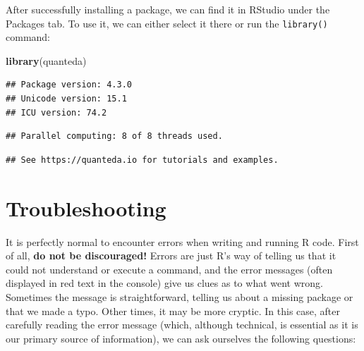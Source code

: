 \documentclass[
]{book}
\newenvironment{Shaded}{\begin{snugshade}}{\end{snugshade}}
\newcommand{\FunctionTok}[1]{\textcolor[rgb]{0.13,0.29,0.53}{\textbf{#1}}}
\newcommand{\NormalTok}[1]{#1}
\begin{document}
After successfully installing a package, we can find it in RStudio under the Packages tab. To use it, we can either select it there or run the \texttt{library()} command:

\begin{Shaded}
\begin{Highlighting}[]
\FunctionTok{library}\NormalTok{(quanteda)}
\end{Highlighting}
\end{Shaded}

\begin{verbatim}
## Package version: 4.3.0
## Unicode version: 15.1
## ICU version: 74.2
\end{verbatim}

\begin{verbatim}
## Parallel computing: 8 of 8 threads used.
\end{verbatim}

\begin{verbatim}
## See https://quanteda.io for tutorials and examples.
\end{verbatim}

\section{Troubleshooting}\label{troubleshooting}

It is perfectly normal to encounter errors when writing and running R code. First of all, \textbf{do not be discouraged!} Errors are just R's way of telling us that it could not understand or execute a command, and the error messages (often displayed in red text in the console) give us clues as to what went wrong. Sometimes the message is straightforward, telling us about a missing package or that we made a typo. Other times, it may be more cryptic. In this case, after carefully reading the error message (which, although technical, is essential as it is our primary source of information), we can ask ourselves the following questions:
\end{document}
